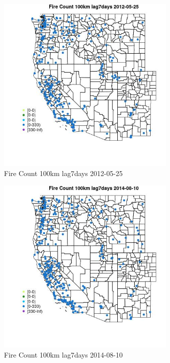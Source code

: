\begin{figure} 
\centering  
\includegraphics[width=0.77\textwidth]{Code_Outputs/Report_ML_input_PM25_Step4_part_e_de_duplicated_aves_compiled_2019-05-18wNAs_MapObsFire_Count_100km_lag7days2012-05-25.jpg} 
\caption{\label{fig:Report_ML_input_PM25_Step4_part_e_de_duplicated_aves_compiled_2019-05-18wNAsMapObsFire_Count_100km_lag7days2012-05-25}Fire Count 100km lag7days 2012-05-25} 
\end{figure} 
 

\begin{figure} 
\centering  
\includegraphics[width=0.77\textwidth]{Code_Outputs/Report_ML_input_PM25_Step4_part_e_de_duplicated_aves_compiled_2019-05-18wNAs_MapObsFire_Count_100km_lag7days2014-08-10.jpg} 
\caption{\label{fig:Report_ML_input_PM25_Step4_part_e_de_duplicated_aves_compiled_2019-05-18wNAsMapObsFire_Count_100km_lag7days2014-08-10}Fire Count 100km lag7days 2014-08-10} 
\end{figure} 
 

